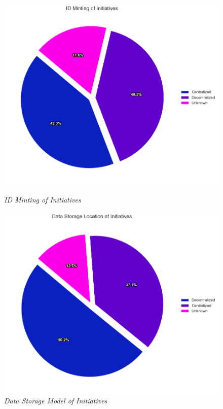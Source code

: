 \begin{figure}[htbp]
    \centering
    \begin{minipage}{0.48\textwidth}
        \centering
        \includegraphics[width=\linewidth]{figures/initiatives_id_minting.png}
        \caption{\textit{ID Minting of Initiatives}}
        \label{fig:initiatives_id_minting}
    \end{minipage}
    \hfill
    \begin{minipage}{0.48\textwidth}
        \centering
        \includegraphics[width=\linewidth]{figures/initiatives_storage_model.png}
        \caption{\textit{Data Storage Model of Initiatives}}
        \label{fig:initiatives_storage_model}
    \end{minipage}
\end{figure}

